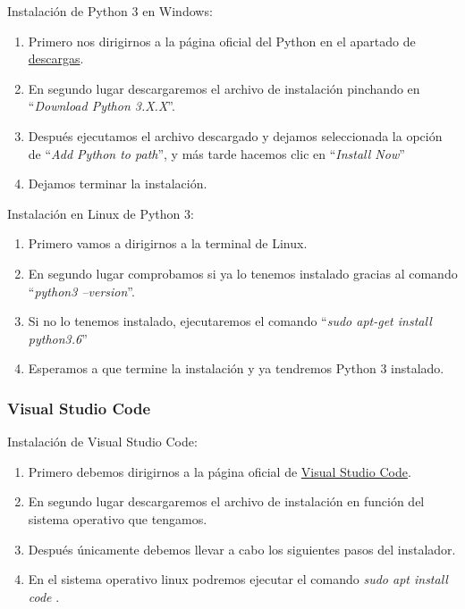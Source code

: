 Instalación de Python 3 en Windows:
\begin{enumerate}
    \item Primero nos dirigirnos a la página oficial del Python en el apartado de \href{https://www.python.org/downloads/}{descargas}.
    \item En segundo lugar descargaremos el archivo de instalación pinchando en ``\textit{Download Python 3.X.X}''.
    \item Después ejecutamos el archivo descargado y dejamos seleccionada la opción de ``\textit{Add Python to path}'', y más tarde hacemos clic en ``\textit{Install Now}''
    \item Dejamos terminar la instalación.
\end{enumerate}

Instalación en Linux de Python 3:
\begin{enumerate}
    \item Primero vamos a dirigirnos a la terminal de Linux.
    \item En segundo lugar comprobamos si ya lo tenemos instalado gracias al comando ``\textit{python3 --version}''.
    \item Si no lo tenemos instalado, ejecutaremos el comando ``\textit{sudo apt-get install python3.6}''
    \item Esperamos a que termine la instalación y ya tendremos Python 3 instalado.
\end{enumerate}

\subsubsection{Visual Studio Code}

Instalación de Visual Studio Code:

\begin{enumerate}
\item
	Primero debemos dirigirnos a la página oficial de \href{https://code.visualstudio.com/}{Visual Studio Code}.
\item
	En segundo lugar descargaremos el archivo de instalación en función del sistema operativo que tengamos.
\item 
	Después únicamente debemos llevar a cabo los siguientes pasos del instalador.

\item
	En el sistema operativo linux podremos ejecutar el comando \textit{sudo apt install code} \cite{vscforlinux}.
\end{enumerate}

